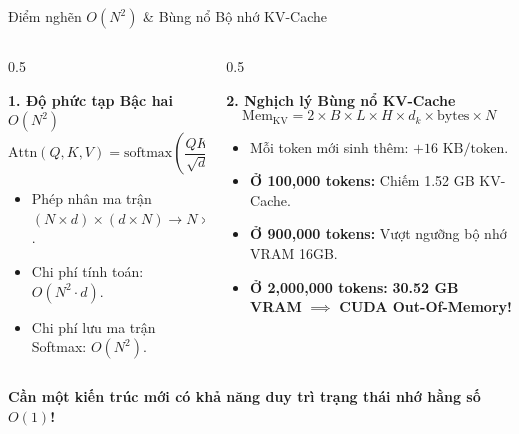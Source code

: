 \documentclass[aspectratio=169, 10pt]{beamer}
\begin{document}
\begin{frame}{Điểm nghẽn $O(N^2)$ \& Bùng nổ Bộ nhớ KV-Cache}
  \begin{columns}
    \begin{column}{0.5\textwidth}
      \begin{block}{\textbf{1. Độ phức tạp Bậc hai $O(N^2)$}}
        \begin{equation*}
          \text{Attn}(Q, K, V) = \text{softmax}\left(\frac{Q K^T}{\sqrt{d_k}}\right) V
        \end{equation*}
        \begin{itemize}
          \item Phép nhân ma trận $(N \times d) \times (d \times N) \to N \times N$.
          \item Chi phí tính toán: $O(N^2 \cdot d)$.
          \item Chi phí lưu ma trận Softmax: $O(N^2)$.
        \end{itemize}
      \end{block}
    \end{column}
    \begin{column}{0.5\textwidth}
      \begin{alertblock}{\textbf{2. Nghịch lý Bùng nổ KV-Cache}}
        \begin{equation*}
          \text{Mem}_{\text{KV}} = 2 \times B \times L \times H \times d_k \times \text{bytes} \times N
        \end{equation*}
        \begin{itemize}
          \item Mỗi token mới sinh thêm: $+16\text{ KB/token}$.
          \item \textbf{Ở 100,000 tokens:} Chiếm 1.52 GB KV-Cache.
          \item \textbf{Ở 900,000 tokens:} Vượt ngưỡng bộ nhớ VRAM 16GB.
          \item \textbf{Ở 2,000,000 tokens:} \textbf{30.52 GB VRAM} $\implies$ \textbf{CUDA Out-Of-Memory!}
        \end{itemize}
      \end{alertblock}
    \end{column}
  \end{columns}
  \vspace{0.2cm}
  \centering
  \textbf{\color{UETBlue}Cần một kiến trúc mới có khả năng duy trì trạng thái nhớ hằng số $O(1)$!}
\end{frame}
\end{document}

